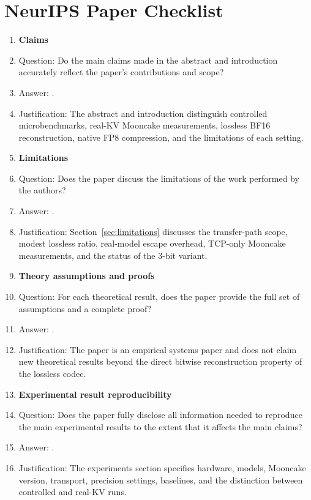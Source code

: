 \section*{NeurIPS Paper Checklist}

\begin{enumerate}

\item {\bf Claims}
    \item[] Question: Do the main claims made in the abstract and introduction accurately reflect the paper's contributions and scope?
    \item[] Answer: \answerYes{}.
    \item[] Justification: The abstract and introduction distinguish controlled microbenchmarks, real-KV Mooncake measurements, lossless BF16 reconstruction, native FP8 compression, and the limitations of each setting.

\item {\bf Limitations}
    \item[] Question: Does the paper discuss the limitations of the work performed by the authors?
    \item[] Answer: \answerYes{}.
    \item[] Justification: Section~\ref{sec:limitations} discusses the transfer-path scope, modest lossless ratio, real-model escape overhead, TCP-only Mooncake measurements, and the status of the 3-bit variant.

\item {\bf Theory assumptions and proofs}
    \item[] Question: For each theoretical result, does the paper provide the full set of assumptions and a complete proof?
    \item[] Answer: \answerNA{}.
    \item[] Justification: The paper is an empirical systems paper and does not claim new theoretical results beyond the direct bitwise reconstruction property of the lossless codec.

\item {\bf Experimental result reproducibility}
    \item[] Question: Does the paper fully disclose all information needed to reproduce the main experimental results to the extent that it affects the main claims?
    \item[] Answer: \answerYes{}.
    \item[] Justification: The experiments section specifies hardware, models, Mooncake version, transport, precision settings, baselines, and the distinction between controlled and real-KV runs.


\end{enumerate}
